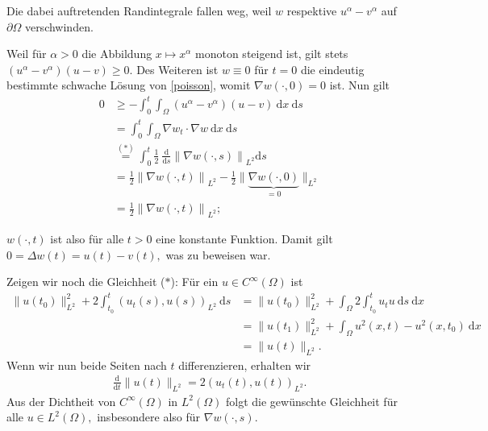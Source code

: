\begin{solution}
Die dabei auftretenden Randintegrale fallen weg, weil $w$ respektive $u^\alpha - v^\alpha$ auf $\partial\Omega$ verschwinden.

Weil für $\alpha > 0$ die Abbildung $x \mapsto x^\alpha$ monoton steigend ist, gilt stets $(u^\alpha - v^\alpha) (u-v) \geq 0.$ Des Weiteren ist $w \equiv 0$ für $t = 0$ die eindeutig bestimmte schwache Lösung von \eqref{poisson}, womit $\nabla w(\cdot, 0) = 0$ ist. Nun gilt
\begin{align*}
    0 &\geq - \int_0^t \int_\Omega (u^\alpha - v^\alpha) (u-v) \mathrm{~d}x \mathrm{~d}s\\
    &= \int_0^t \int_\Omega \nabla w_t \cdot \nabla w \mathrm{~d}x \mathrm{~d}s\\
    &\stackrel{(\ast)}{=} \int_0^t \frac{1}{2} ~\frac{\mathrm{d}}{\mathrm{d}s} \left\| \nabla w(\cdot, s)\right\|_{L^2} \mathrm{d}s\\
    &= \frac{1}{2} \left\| \nabla w(\cdot, t)\right\|_{L^2} - \frac{1}{2} \| \underbrace{\nabla w(\cdot, 0)}_{=0}\|_{L^2}\\
    &= \frac{1}{2} \left\| \nabla w(\cdot, t)\right\|_{L^2};
\end{align*}

$w(\cdot, t)$ ist also für alle $t > 0$ eine konstante Funktion. Damit gilt $0 = \Delta w(t) = u(t) - v(t),$ was zu beweisen war.

Zeigen wir noch die Gleichheit ($\ast$): Für ein $u \in C^\infty(\Omega)$ ist
\begin{align*}
    \|u(t_0)\|^2_{L^2} + 2 \int_{t_0}^{t} (u_t(s), u(s))_{L^2} \mathrm{~d}s
    &= \|u(t_0)\|^2_{L^2} + \int_\Omega 2 \int_{t_0}^{t} u_t u \mathrm{~d}s \mathrm{~d}x\\
    &= \|u(t_1)\|^2_{L^2} + \int_\Omega u^2(x, t) - u^2(x, t_0) \mathrm{~d}x\\
    &= \| u(t)\|_{L^2}.
\end{align*}
Wenn wir nun beide Seiten nach $t$ differenzieren, erhalten wir
\begin{align*}
    \frac{\mathrm{d}}{\mathrm{d}t} \|u(t)\|_{L^2} = 2 \left(u_t(t), u(t)\right)_{L^2}.
\end{align*}
Aus der Dichtheit von $C^\infty(\Omega)$ in $L^2(\Omega)$ folgt die gewünschte Gleichheit für alle $u \in L^2(\Omega),$ insbesondere also für $\nabla w(\cdot, s).$
\end{solution}

